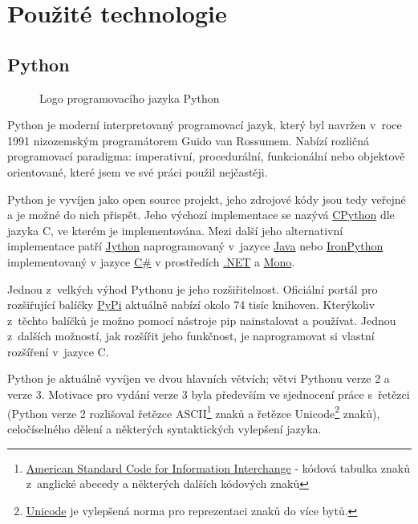 \section{Použité technologie}

\subsection{Python}
\label{subsec:python}

\begin{wrapfigure}[10]{R}{0.5\textwidth}
 \centering
 
 \caption{Logo programovacího jazyka Python}
\end{wrapfigure}

Python je moderní interpretovaný programovací jazyk, který byl navržen v~roce 1991 nizozemským programátorem Guido van Rossumem. Nabízí rozličná programovací paradigma: imperativní, procedurální, funkcionální nebo objektově orientované, které jsem ve své práci použil nejčastěji.

Python je vyvíjen jako open source projekt, jeho zdrojové kódy jsou tedy veřejné a je možné do nich přispět. Jeho výchozí implementace se nazývá \href{https://en.wikipedia.org/wiki/CPython}{CPython} dle jazyka C, ve kterém je implementována. Mezi další jeho alternativní implementace patří \href{https://cs.wikipedia.org/wiki/Jython}{Jython} naprogramovaný v~jazyce \href{https://cs.wikipedia.org/wiki/Java_%28programovac%C3%AD_jazyk%29}{Java} nebo \href{https://cs.wikipedia.org/wiki/IronPython}{IronPython} implementovaný v jazyce \href{https://cs.wikipedia.org/wiki/C_Sharp}{C\#} v prostředích \href{https://cs.wikipedia.org/wiki/.NET}{.NET} a \href{https://cs.wikipedia.org/wiki/Mono_%28platforma%29}{Mono}.

Jednou z~velkých výhod Pythonu je jeho rozšiřitelnost. Oficiální portál pro rozšiřující balíčky \href{https://pypi.python.org/pypi}{PyPi} aktuálně nabízí okolo 74 tisíc knihoven. Kterýkoliv z~těchto balíčků je možno pomocí nástroje pip nainstalovat a používat. Jednou z~dalších možností, jak rozšířit jeho funkčnost, je naprogramovat si vlastní rozšíření v~jazyce C.

\begin{sloppypar}
	Python je aktuálně vyvíjen ve dvou hlavních větvích; větvi Pythonu verze 2 a verze 3. Motivace pro vydání verze 3 byla především ve sjednocení práce s~řetězci (Python verze 2 rozlišoval řetězce ASCII\footnote{\href{https://cs.wikipedia.org/wiki/ASCII}{American Standard Code for Information Interchange} - kódová tabulka znaků z~anglické abecedy a některých dalších kódových znaků} znaků a řetězce Unicode\footnote{\href{https://cs.wikipedia.org/wiki/Unicode}{Unicode} je vylepšená norma pro reprezentaci znaků do více bytů.} znaků), celočíselného dělení a některých syntaktických vylepšení jazyka.
\end{sloppypar}

